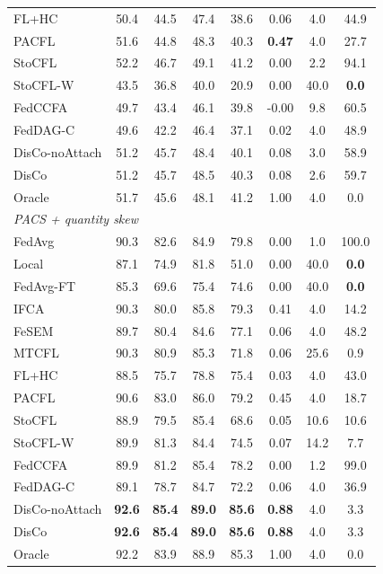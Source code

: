 \begin{tabular}{lccccccc}
FL+HC & 50.4 & 44.5 & 47.4 & 38.6 & 0.06 & 4.0 & 44.9 \\
PACFL & 51.6 & 44.8 & 48.3 & 40.3 & \textbf{0.47} & 4.0 & 27.7 \\
StoCFL & 52.2 & 46.7 & 49.1 & 41.2 & 0.00 & 2.2 & 94.1 \\
StoCFL-W & 43.5 & 36.8 & 40.0 & 20.9 & 0.00 & 40.0 & \textbf{0.0} \\
FedCCFA & 49.7 & 43.4 & 46.1 & 39.8 & -0.00 & 9.8 & 60.5 \\
FedDAG-C & 49.6 & 42.2 & 46.4 & 37.1 & 0.02 & 4.0 & 48.9 \\
DisCo-noAttach & 51.2 & 45.7 & 48.4 & 40.1 & 0.08 & 3.0 & 58.9 \\
DisCo & 51.2 & 45.7 & 48.5 & 40.3 & 0.08 & 2.6 & 59.7 \\
Oracle & 51.7 & 45.6 & 48.1 & 41.2 & 1.00 & 4.0 & 0.0 \\
\midrule
\multicolumn{8}{l}{\textit{PACS + quantity skew}}\\
FedAvg & 90.3 & 82.6 & 84.9 & 79.8 & 0.00 & 1.0 & 100.0 \\
Local & 87.1 & 74.9 & 81.8 & 51.0 & 0.00 & 40.0 & \textbf{0.0} \\
FedAvg-FT & 85.3 & 69.6 & 75.4 & 74.6 & 0.00 & 40.0 & \textbf{0.0} \\
IFCA & 90.3 & 80.0 & 85.8 & 79.3 & 0.41 & 4.0 & 14.2 \\
FeSEM & 89.7 & 80.4 & 84.6 & 77.1 & 0.06 & 4.0 & 48.2 \\
MTCFL & 90.3 & 80.9 & 85.3 & 71.8 & 0.06 & 25.6 & 0.9 \\
FL+HC & 88.5 & 75.7 & 78.8 & 75.4 & 0.03 & 4.0 & 43.0 \\
PACFL & 90.6 & 83.0 & 86.0 & 79.2 & 0.45 & 4.0 & 18.7 \\
StoCFL & 88.9 & 79.5 & 85.4 & 68.6 & 0.05 & 10.6 & 10.6 \\
StoCFL-W & 89.9 & 81.3 & 84.4 & 74.5 & 0.07 & 14.2 & 7.7 \\
FedCCFA & 89.9 & 81.2 & 85.4 & 78.2 & 0.00 & 1.2 & 99.0 \\
FedDAG-C & 89.1 & 78.7 & 84.7 & 72.2 & 0.06 & 4.0 & 36.9 \\
DisCo-noAttach & \textbf{92.6} & \textbf{85.4} & \textbf{89.0} & \textbf{85.6} & \textbf{0.88} & 4.0 & 3.3 \\
DisCo & \textbf{92.6} & \textbf{85.4} & \textbf{89.0} & \textbf{85.6} & \textbf{0.88} & 4.0 & 3.3 \\
Oracle & 92.2 & 83.9 & 88.9 & 85.3 & 1.00 & 4.0 & 0.0 \\
\bottomrule
\end{tabular}
